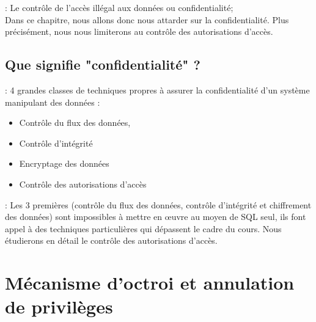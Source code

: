 \documentclass[10pt]{beamer}
\begin{document}
\begin{frame}{\secname : \subsecname}
    Le contrôle de l'accès illégal aux données ou confidentialité;\\
    Dans ce chapitre, nous allons donc nous attarder sur la confidentialité.
    Plus précisément, nous nous limiterons au contrôle des autorisations d'accès.
\end{frame}

\subsection{Que signifie "confidentialité" ?}
\begin{frame}{\secname : \subsecname}
    4 grandes classes de techniques propres à assurer la confidentialité d'un système manipulant des données :
    \begin{itemize}
        \item Contrôle du flux des données,
        \item Contrôle d'intégrité
        \item Encryptage des données
        \item Contrôle des autorisations d'accès
    \end{itemize}
\end{frame}

\begin{frame}{\secname : \subsecname}
    Les 3 premières (contrôle du flux des données, contrôle d'intégrité et chiffrement des données) sont impossibles à mettre en œuvre au moyen de SQL seul, ils font appel à des techniques particulières qui dépassent le cadre du cours.
    Nous étudierons en détail le contrôle des autorisations d'accès.
\end{frame}

\section{Mécanisme d'octroi et annulation de privilèges}
\end{document}
